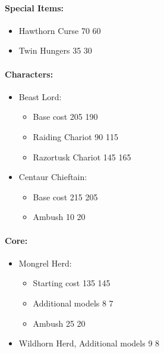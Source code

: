 

\subtitle{beta 2.2}


\begin{multicols}{2}
\paragraph{Special Items:}
\begin{itemize}
	\item Hawthorn Curse 70 \costdown{} 60
	\item Twin Hungers 35 \costdown{} 30
\end{itemize}
\paragraph{Characters:}
\begin{itemize}
	\item Beast Lord:
	\begin{itemize}
		\item Base cost 205 \costdown{} 190
		\item Raiding Chariot 90 \costup{} 115
		\item Razortusk Chariot 145 \costup{} 165
	\end{itemize}
	\item Centaur Chieftain:
	\begin{itemize}	
		\item Base cost 215 \costdown{} 205
		\item Ambush 10 \costup{} 20
	\end{itemize}
\end{itemize}
\paragraph{Core:}
\begin{itemize}
	\item Mongrel Herd:
	\begin{itemize}		
		\item Starting cost 135 \costup{} 145
		\item Additional models 8 \costdown{} 7
		\item Ambush 25 \costdown{} 20
	\end{itemize}		
	\item Wildhorn Herd, Additional models 9 \costdown{} 8
\end{itemize}
\columnbreak

\end{multicols}
